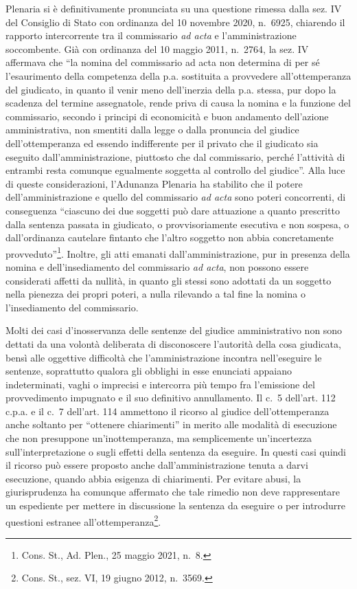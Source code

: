 \documentclass[12pt,it,a4paper,]{report}
\begin{document}
Plenaria si è definitivamente pronunciata su una questione rimessa dalla
sez. IV del Consiglio di Stato con ordinanza del 10 novembre 2020,
n.~6925, chiarendo il rapporto intercorrente tra il commissario \emph{ad
acta} e l'amministrazione soccombente. Già con ordinanza del 10 maggio
2011, n.~2764, la sez. IV affermava che ``la nomina del commissario ad
acta non determina di per sé l'esaurimento della competenza della p.a.
sostituita a provvedere all'ottemperanza del giudicato, in quanto il
venir meno dell'inerzia della p.a. stessa, pur dopo la scadenza del
termine assegnatole, rende priva di causa la nomina e la funzione del
commissario, secondo i principi di economicità e buon andamento
dell'azione amministrativa, non smentiti dalla legge o dalla pronuncia
del giudice dell'ottemperanza ed essendo indifferente per il privato che
il giudicato sia eseguito dall'amministrazione, piuttosto che dal
commissario, perché l'attività di entrambi resta comunque egualmente
soggetta al controllo del giudice''. Alla luce di queste considerazioni,
l'Adunanza Plenaria ha stabilito che il potere dell'amministrazione e
quello del commissario \emph{ad acta} sono poteri concorrenti, di
conseguenza ``ciascuno dei due soggetti può dare attuazione a quanto
prescritto dalla sentenza passata in giudicato, o provvisoriamente
esecutiva e non sospesa, o dall'ordinanza cautelare fintanto che l'altro
soggetto non abbia concretamente provveduto''\footnote{Cons. St., Ad.
  Plen., 25 maggio 2021, n.~8.}. Inoltre, gli atti emanati
dall'amministrazione, pur in presenza della nomina e dell'insediamento
del commissario \emph{ad acta}, non possono essere considerati affetti
da nullità, in quanto gli stessi sono adottati da un soggetto nella
pienezza dei propri poteri, a nulla rilevando a tal fine la nomina o
l'insediamento del commissario.

Molti dei casi d'inosservanza delle sentenze del giudice amministrativo
non sono dettati da una volontà deliberata di disconoscere l'autorità
della cosa giudicata, bensì alle oggettive difficoltà che
l'amministrazione incontra nell'eseguire le sentenze, soprattutto
qualora gli obblighi in esse enunciati appaiano indeterminati, vaghi o
imprecisi e intercorra più tempo fra l'emissione del provvedimento
impugnato e il suo definitivo annullamento. Il c.~5 dell'art. 112 c.p.a.
e il c.~7 dell'art. 114 ammettono il ricorso al giudice
dell'ottemperanza anche soltanto per ``ottenere chiarimenti'' in merito
alle modalità di esecuzione che non presuppone un'inottemperanza, ma
semplicemente un'incertezza sull'interpretazione o sugli effetti della
sentenza da eseguire. In questi casi quindi il ricorso può essere
proposto anche dall'amministrazione tenuta a darvi esecuzione, quando
abbia esigenza di chiarimenti. Per evitare abusi, la giurisprudenza ha
comunque affermato che tale rimedio non deve rappresentare un espediente
per mettere in discussione la sentenza da eseguire o per introdurre
questioni estranee all'ottemperanza\footnote{Cons. St., sez. VI, 19
  giugno 2012, n.~3569.}.
\end{document}

